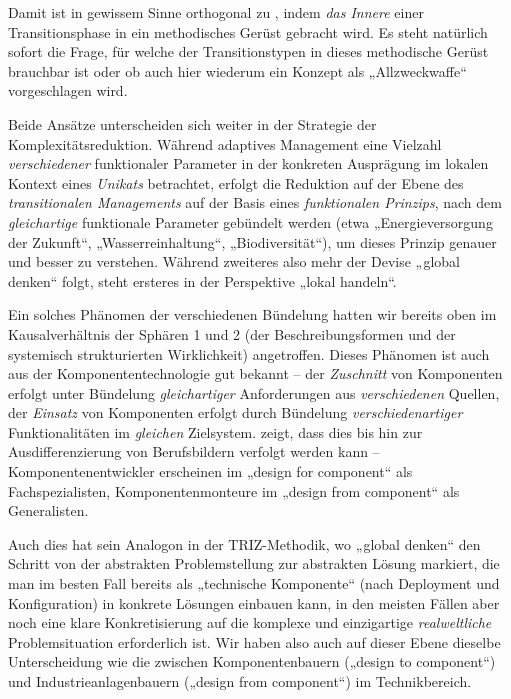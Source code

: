 \documentclass[11pt,a4paper]{article}
\begin{document}
Damit ist \cite{Foxon2009} in gewissem Sinne orthogonal zu \cite{Geels2007},
indem \emph{das Innere} einer Transitionsphase in ein methodisches Gerüst
gebracht wird. Es steht natürlich sofort die Frage, für welche der
Transitionstypen in \cite{Geels2007} dieses methodische Gerüst brauchbar ist
oder ob auch hier wiederum ein Konzept als „Allzweckwaffe“ vorgeschlagen wird.

Beide Ansätze unterscheiden sich weiter in der Strategie der
Komplexitätsreduktion.  Während adaptives Management eine Vielzahl
\emph{verschiedener} funktionaler Parameter in der konkreten Ausprägung im
lokalen Kontext eines \emph{Unikats} betrachtet, erfolgt die Reduktion auf der
Ebene des \emph{transitionalen Managements} auf der Basis eines
\emph{funktionalen Prinzips}, nach dem \emph{gleichartige} funktionale
Parameter gebündelt werden (etwa „Energieversorgung der Zukunft“,
„Wasserreinhaltung“, „Biodiversität“), um dieses Prinzip genauer und besser zu
verstehen. Während zweiteres also mehr der Devise „global denken“ folgt, steht
ersteres in der Perspektive „lokal handeln“.

Ein solches Phänomen der verschiedenen Bündelung hatten wir bereits oben im
Kausalverhältnis der Sphären 1 und 2 (der Beschreibungsformen und der
systemisch strukturierten Wirklichkeit) angetroffen. Dieses Phänomen ist auch
aus der Komponententechnologie \cite{Szyperski2002} gut bekannt -- der
\emph{Zuschnitt} von Komponenten erfolgt unter Bündelung \emph{gleichartiger}
Anforderungen aus \emph{verschiedenen} Quellen, der \emph{Einsatz} von
Komponenten erfolgt durch Bündelung \emph{verschiedenartiger} Funktionalitäten
im \emph{gleichen} Zielsystem. \cite{Szyperski2002} zeigt, dass dies bis hin
zur Ausdifferenzierung von Berufsbildern verfolgt werden kann --
Komponentenentwickler erscheinen im „design for component“ als
Fachspezialisten, Komponentenmonteure im „design from component“ als
Generalisten.

Auch dies hat sein Analogon in der TRIZ-Methodik, wo „global denken“ den
Schritt von der abstrakten Problemstellung zur abstrakten Lösung markiert, die
man im besten Fall bereits als „technische Komponente“ (nach Deployment und
Konfiguration) in konkrete Lösungen einbauen kann, in den meisten Fällen aber
noch eine klare Konkretisierung auf die komplexe und einzigartige
\emph{realweltliche} Problemsituation erforderlich ist. Wir haben also auch
auf dieser Ebene dieselbe Unterscheidung wie die zwischen Komponentenbauern
(„design to component“) und Industrieanlagenbauern („design from component“)
im Technikbereich.
\end{document}
